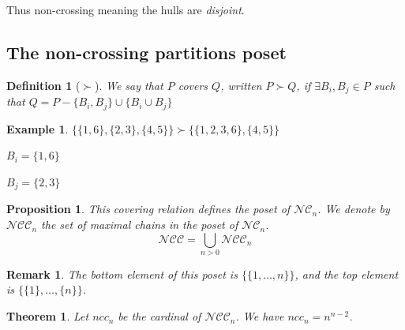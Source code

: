 \documentclass[12pt]{report}
\newtheorem{theorem}{Theorem}
\newtheorem*{prop}{Proposition}
\newtheorem{definition}{Definition}
\newtheorem*{example}{Example}
\newtheorem*{rem}{Remark}
\begin{document}
Thus non-crossing meaning the hulls are \emph{disjoint}.\\

\subsection{The non-crossing partitions poset}

\begin{definition}[$\succ$]
    We say that $P$ covers $Q$, written $P \succ Q$,
    if $\exists B_i, B_j \in P$ such that
    $Q = P - \{B_i, B_j\} \cup \{B_i \cup B_j\}$    
\end{definition}

\begin{example}
    $\{\{1, 6\}, \{2, 3\}, \{4, 5\}\} \succ
    \{\{1, 2, 3, 6\}, \{4, 5\}\}$\\
    \begin{itemize*}
        \item $B_i = \{1, 6\}$\\
        \item $B_j = \{2, 3\}$\\
    \end{itemize*}
\end{example}

\begin{prop}
    This covering relation defines the \emph{poset}
    of $\mathcal{NC}_n$.
    We denote by $\mathcal{NCC}_n$ the set of
    \emph{maximal chains} in the poset of $\mathcal{NC}_n$.\\
    $$\mathcal{NCC} = \bigcup_{n > 0}{\mathcal{NCC}_n}$$
\end{prop}

\begin{rem}
    The bottom element of this poset is $\{\{1, \ldots, n\}\}$,
    and the top element is $\{\{1\}, \ldots, \{n\}\}$.
\end{rem}

\begin{theorem}
    Let $ncc_n$ be the cardinal of $\mathcal{NCC}_n$.
    We have $ncc_n = n^{n - 2}$.
\end{theorem}
\end{document}
